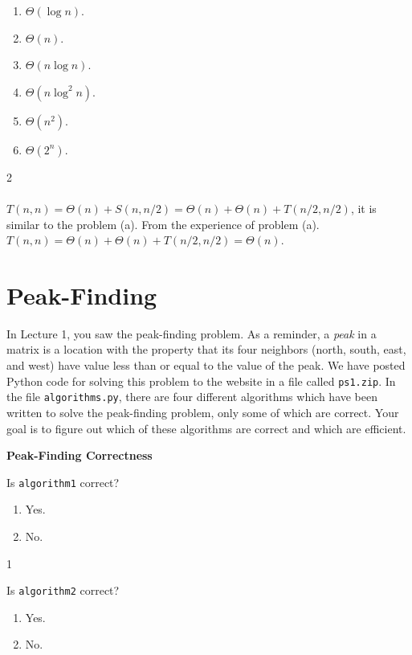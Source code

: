 \documentclass[12pt,twoside]{article}
\begin{document}
\begin{problems}
\begin{problemparts}
\begin{enumerate}
\item $\Theta(\log n)$.
\item $\Theta(n)$.
\item $\Theta(n \log n)$.
\item $\Theta(n \log^2 n)$.
\item $\Theta(n^2)$.
\item $\Theta(2^n)$.
\end{enumerate}

\ifsolution \solution{}
2
\\
\\
$T(n,n)= \Theta(n)+S(n,n/2)=\Theta(n)+\Theta(n)+T(n/2,n/2)$, it is similar to the problem (a). From the experience of problem (a). $T(n,n) = \Theta(n)+\Theta(n)+T(n/2,n/2) = \Theta(n)$.
\\
\fi

\end{problemparts}

\section*{Peak-Finding}

In Lecture 1,
you saw the peak-finding problem.
As a reminder,
a \emph{peak} in a matrix
is a location with the property that its four neighbors
(north, south, east, and west)
have value less than or equal to the value of the peak.
We have posted Python code for solving this problem
to the website in a file called \texttt{ps1.zip}.
In the file \texttt{algorithms.py},
there are four different algorithms
which have been written
to solve the peak-finding problem,
only some of which are correct.
Your goal is to figure out
which of these algorithms are correct
and which are efficient.

\problem {} \textbf{Peak-Finding Correctness}

\begin{problemparts}

\problempart {} Is \texttt{algorithm1} correct?
\begin{enumerate}
\item Yes.
\item No.
\end{enumerate}

\ifsolution \solution{}
1
\fi

\problempart {} Is \texttt{algorithm2} correct?
\begin{enumerate}
\item Yes.
\item No.
\end{enumerate}


\end{problemparts}
\end{problems}
\end{document}
